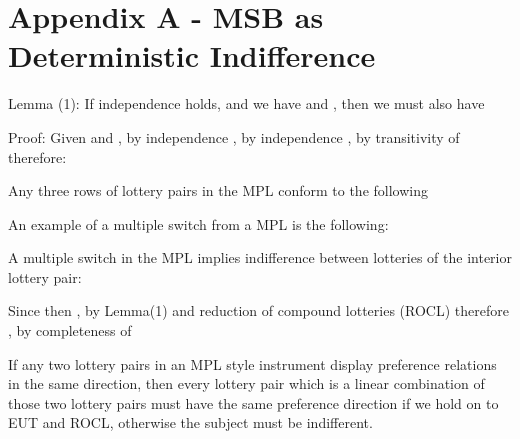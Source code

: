 \documentclass[../main.tex]{subfiles}
\begin{document}
\section{Appendix A - MSB as Deterministic Indifference}

Lemma (1): If independence holds, and we have  and , then we must also have 


Proof:
Given  and 
			, by independence	
			, by independence	
	, by transitivity of
therefore:


Any three rows of lottery pairs in the \textcite[623]{Grether1979} MPL conform to the following



An example of a multiple switch from a MPL is the following:



A multiple switch in the MPL implies indifference between lotteries of the interior lottery pair:

Since		 
then		, by Lemma(1) and reduction of compound lotteries (ROCL)
therefore	, by completeness of 

If any two lottery pairs in an MPL style instrument display preference relations in the same direction, then every lottery pair which is a linear combination of those two lottery pairs must have the same preference direction if we hold on to EUT and ROCL, otherwise the subject must be indifferent.

\newpage

\printbibliography[segment=1, heading=subbibliography]
\end{document}
